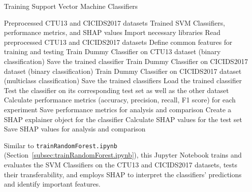 \begin{algorithm}[H]
\caption{Training Support Vector Machine Classifiers}\label{alg:trainSVM} 
\begin{algorithmic}[1]
\Require%
Preprocessed CTU13 and CICIDS2017 datasets
\Ensure%
Trained SVM Classifiers, performance metrics, and SHAP values  
\State%
Import necessary libraries
\State%
Read preprocessed CTU13 and CICIDS2017 datasets
\State%
Define common features for training and testing
        \State%
        Train Dummy Classifier on CTU13 dataset (binary classification)
        \State%
        Save the trained classifier
        \State%
        Train Dummy Classifier on CICIDS2017 dataset (binary classification)
        \State%
        Train Dummy Classifier on CICIDS2017 dataset (multiclass classification)
        \State%
        Save the trained classifiers
    \EndIf%
\EndFor%
    \State%
    Load the trained classifier
    \State%
    Test the classifier on its corresponding test set as well as the other dataset
    \State%
    Calculate performance metrics (accuracy, precision, recall, F1 score) for each experiment
    \State%
    Save performance metrics for analysis and comparison
    \State%
    Create a SHAP explainer object for the classifier
    \State%
    Calculate SHAP values for the test set
    \State%
    Save SHAP values for analysis and comparison
\EndFor%
\end{algorithmic}
\end{algorithm}

Similar to \texttt{trainRandomForest.ipynb} (Section~\ref{subsec:trainRandomForest.ipynb}), this Jupyter Notebook trains and evaluates the SVM Classifiers on the CTU13 and CICIDS2017 datasets, tests their transferability, and employs SHAP to interpret the classifiers' predictions and identify important features.
